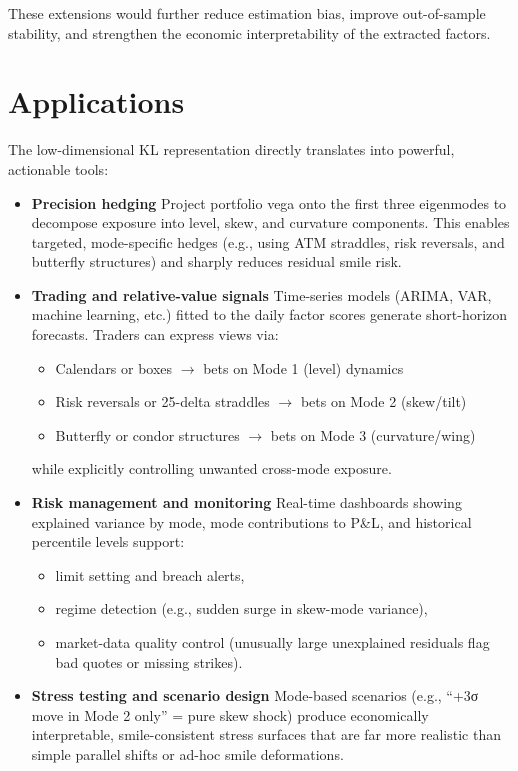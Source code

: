 \documentclass[a4paper,12pt]{report}
\begin{document}
These extensions would further reduce estimation bias, improve out-of-sample stability, and strengthen the economic interpretability of the extracted factors.



\section{Applications}
The low-dimensional KL representation directly translates into powerful, actionable tools:

\begin{itemize}
    \item \textbf{Precision hedging}  
      Project portfolio vega onto the first three eigenmodes to decompose exposure into level, skew, and curvature components. This enables targeted, mode-specific hedges (e.g., using ATM straddles, risk reversals, and butterfly structures) and sharply reduces residual smile risk.

    \item \textbf{Trading and relative-value signals}  
      Time-series models (ARIMA, VAR, machine learning, etc.) fitted to the daily factor scores generate short-horizon forecasts. Traders can express views via:
      \begin{itemize}
          \item Calendars or boxes $\to$ bets on Mode 1 (level) dynamics
          \item Risk reversals or 25-delta straddles $\to$ bets on Mode 2 (skew/tilt)
          \item Butterfly or condor structures $\to$ bets on Mode 3 (curvature/wing)
      \end{itemize}
      while explicitly controlling unwanted cross-mode exposure.
    \item \textbf{Risk management and monitoring}  
      Real-time dashboards showing explained variance by mode, mode contributions to P\&L, and historical percentile levels support:
      \begin{itemize}
          \item limit setting and breach alerts,
          \item regime detection (e.g., sudden surge in skew-mode variance),
          \item market-data quality control (unusually large unexplained residuals flag bad quotes or missing strikes).
      \end{itemize}

    \item \textbf{Stress testing and scenario design}  
      Mode-based scenarios (e.g., “+3σ move in Mode 2 only” = pure skew shock) produce economically interpretable, smile-consistent stress surfaces that are far more realistic than simple parallel shifts or ad-hoc smile deformations.
\end{itemize}
\end{document}
